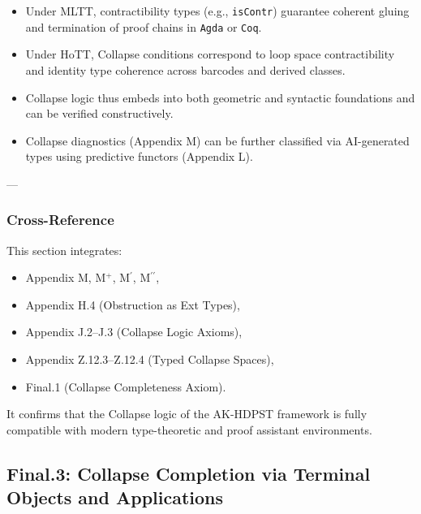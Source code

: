 \documentclass[11pt]{article}
\begin{document}
\begin{axiom}
\begin{axiom}
{{\begin{itemize}
  \item Under MLTT, contractibility types (e.g., \texttt{isContr}) guarantee coherent gluing  
  and termination of proof chains in \texttt{Agda} or \texttt{Coq}.

  \item Under HoTT, Collapse conditions correspond to loop space contractibility  
  and identity type coherence across barcodes and derived classes.

  \item Collapse logic thus embeds into both geometric and syntactic foundations  
  and can be verified constructively.

  \item Collapse diagnostics (Appendix M) can be further classified via AI-generated types  
  using predictive functors (Appendix L).
\end{itemize}

---

\subsubsection*{Cross-Reference}

This section integrates:
\begin{itemize}
  \item Appendix M, M$^+$, M$^\prime$, M$^{\prime\prime}$,
  \item Appendix H.4 (Obstruction as Ext Types),
  \item Appendix J.2–J.3 (Collapse Logic Axioms),
  \item Appendix Z.12.3–Z.12.4 (Typed Collapse Spaces),
  \item Final.1 (Collapse Completeness Axiom).
\end{itemize}

It confirms that the Collapse logic of the AK-HDPST framework  
is fully compatible with modern type-theoretic and proof assistant environments.






\subsection*{Final.3: Collapse Completion via Terminal Objects and Applications}

}}
\end{axiom}
\end{axiom}
\end{document}
